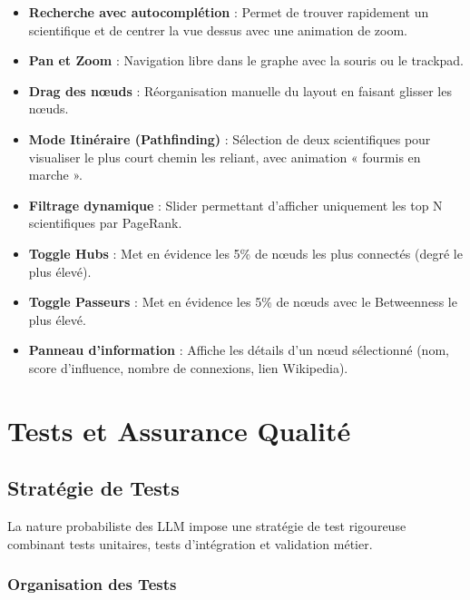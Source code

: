 \documentclass[12pt,a4paper]{report}
\begin{document}
\begin{itemize}
    \item \textbf{Recherche avec autocomplétion} : Permet de trouver rapidement un scientifique et de centrer la vue dessus avec une animation de zoom.

    \item \textbf{Pan et Zoom} : Navigation libre dans le graphe avec la souris ou le trackpad.

    \item \textbf{Drag des nœuds} : Réorganisation manuelle du layout en faisant glisser les nœuds.

    \item \textbf{Mode Itinéraire (Pathfinding)} : Sélection de deux scientifiques pour visualiser le plus court chemin les reliant, avec animation « fourmis en marche ».

    \item \textbf{Filtrage dynamique} : Slider permettant d'afficher uniquement les top N scientifiques par PageRank.

    \item \textbf{Toggle Hubs} : Met en évidence les 5\% de nœuds les plus connectés (degré le plus élevé).

    \item \textbf{Toggle Passeurs} : Met en évidence les 5\% de nœuds avec le Betweenness le plus élevé.

    \item \textbf{Panneau d'information} : Affiche les détails d'un nœud sélectionné (nom, score d'influence, nombre de connexions, lien Wikipedia).
\end{itemize}

\chapter{Tests et Assurance Qualité}

\section{Stratégie de Tests}

La nature probabiliste des LLM impose une stratégie de test rigoureuse combinant tests unitaires, tests d'intégration et validation métier.

\subsection{Organisation des Tests}
\end{document}
